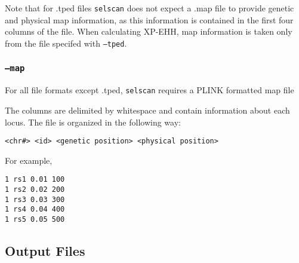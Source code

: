 \documentclass[12pt]{article}%
\begin{document}
Note that for .tped files {\tt selscan} does not expect a .map file to provide genetic and physical map information, as this information is contained in the first four columns of the file.  When calculating XP-EHH, map information is taken only from the file specifed with {\tt --tped}.

\subsubsection{{\tt --map}}

For all file formats except .tped, {\tt selscan} requires a PLINK \cite[]{PurcellEtAl07} formatted map file

The columns are delimited by whitespace and contain information about each locus.  The file is organized in the following way:
\begin{lstlisting}
<chr#> <id> <genetic position> <physical position>
\end{lstlisting}
For example,
\begin{lstlisting}
1 rs1 0.01 100
1 rs2 0.02 200
1 rs3 0.03 300
1 rs4 0.04 400
1 rs5 0.05 500
\end{lstlisting}

\subsection{Output Files}
\end{document}
